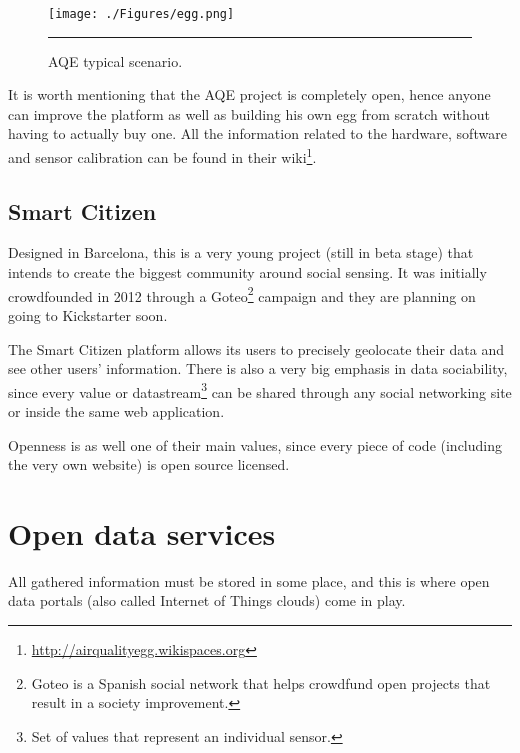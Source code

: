 \begin{figure}[htbp]
    \centering
    \texttt{[image: ./Figures/egg.png]}
        \rule{35em}{0.5pt}
        \caption[Air Quality Egg typical scenario]{AQE typical scenario.}
    \label{fig:aqe}
\end{figure}

It is worth mentioning that the AQE project is completely open, hence anyone can improve the platform as well as building his own egg from scratch without having to actually buy one. All the information related to the hardware, software and sensor calibration can be found in their wiki\footnote{\url{http://airqualityegg.wikispaces.org}}.

\subsection{Smart Citizen}

Designed in Barcelona, this is a very young project (still in beta stage) that intends to create the biggest community around social sensing. It was initially crowdfounded in 2012 through a Goteo\footnote{Goteo is a Spanish social network that helps crowdfund open projects that result in a society improvement.} campaign and they are planning on going to Kickstarter soon.

The Smart Citizen platform allows its users to precisely geolocate their data and see other users' information. There is also a very big emphasis in data sociability, since every value or datastream\footnote{Set of values that represent an individual sensor.} can be shared through any social networking site or inside the same web application.

Openness is as well one of their main values, since every piece of code (including the very own website) is open source licensed.


\section{Open data services}

All gathered information must be stored in some place, and this is where open data portals (also called Internet of Things clouds) come in play. 


